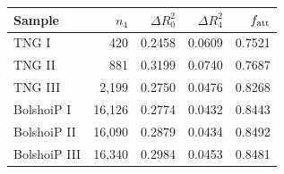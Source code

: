 \begin{tabular}{lrrrr}\toprule
Sample & $n_4$ & $\Delta R^2_{0}$ & $\Delta R^2_4$ & $f_{\rm att}$ \\\midrule
TNG I & 420 & 0.2458 & 0.0609 & 0.7521 \\
TNG II & 881 & 0.3199 & 0.0740 & 0.7687 \\
TNG III & 2,199 & 0.2750 & 0.0476 & 0.8268 \\
BolshoiP I & 16,126 & 0.2774 & 0.0432 & 0.8443 \\
BolshoiP II & 16,090 & 0.2879 & 0.0434 & 0.8492 \\
BolshoiP III & 16,340 & 0.2984 & 0.0453 & 0.8481 \\
\bottomrule\end{tabular}
